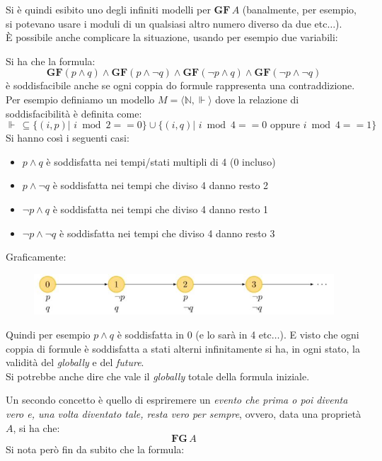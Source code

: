 \documentclass[a4paper,12pt, oneside]{book}
\begin{document}
Si è quindi esibito uno degli infiniti modelli per $\mathbf{GF}\,A$ (banalmente,
per esempio, si potevano usare i moduli di un qualsiasi altro numero diverso da
due etc$\ldots$).\\
È possibile anche complicare la situazione, usando per esempio due variabili:
\begin{esempio}
  Si ha che la formula:
  \[\mathbf{GF}(p\land q)\land\mathbf{GF}(p\land \neg q)\land \mathbf{GF}(\neg
    p\land q)\land \mathbf{GF}(\neg p\land \neg q)\]
  è soddisfacibile anche se ogni coppia do formule rappresenta una
  contraddizione.\\
  Per esempio definiamo un modello $M=\langle\mathbb{N},\Vdash\rangle$ dove la
  relazione di soddisfacibilità è definita come:
  \[\Vdash\, \subseteq\{(i,p)|\,\,i\bmod 2 == 0\}\cup \{(i,q)|\,\,i\bmod 4 ==
    0\mbox{ oppure }i\bmod 4 == 1\}\]
  \newpage
  Si hanno così i seguenti casi:
  \begin{itemize}
    \item $p\land q$ è soddisfatta nei tempi/stati multipli di 4 (0 incluso)
    \item $p\land \neg q$ è soddisfatta nei tempi che diviso 4 danno resto 2
    \item $\neg p\land q$ è soddisfatta nei tempi che diviso 4 danno resto 1
    \item $\neg p\land\neg q$ è soddisfatta nei tempi che diviso 4 danno resto 3
  \end{itemize}
  Graficamente:
  \begin{figure}[H]
    \centering
    \includegraphics[scale = 0.5]{img/pltl19.jpg}
  \end{figure}
  Quindi per esempio $p\land q$ è soddisfatta in 0 (e lo sarà in 4 etc$\ldots$).
  E visto che ogni coppia di formule è soddisfatta a stati alterni infinitamente
  si ha, in ogni stato, la validità del \emph{globally} e del \emph{future}.\\
  Si potrebbe anche dire che vale il \emph{globally} totale della formula
  iniziale. 
\end{esempio}
Un secondo concetto è quello di espriremere un \textit{evento che prima o poi
  diventa vero e, una volta diventato tale, resta vero per sempre}, ovvero, data
una proprietà $A$, si ha che:
\[\mathbf{FG}\,A\]
Si nota però fin da subito che la formula:
\end{document}
